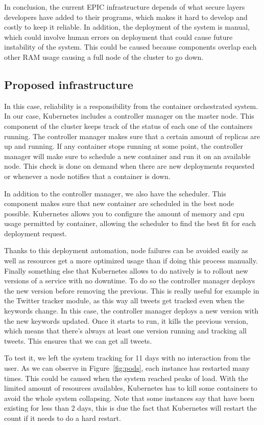 In conclusion, the current EPIC infrastructure depends of what secure layers developers have added to their programs, which makes it hard to develop and costly to keep it reliable. In addition, the deployment of the system is manual, which could involve human errors on deployment that could cause future instability of the system. This could be caused because components overlap each other RAM usage causing a full node of the cluster to go down.

\subsection{Proposed infrastructure}

In this case, reliability is a responsibility from the container orchestrated system. In our case, Kubernetes includes a controller manager on the master node. This component of the cluster keeps track of the status of each one of the containers running. The controller manager makes sure that a certain amount of replicas are up and running. If any container stops running at some point, the controller manager will make sure to schedule a new container and run it on an available node. This check is done on demand when there are new deployments requested or whenever a node notifies that a container is down.

 In addition to the controller manager, we also have the scheduler. This component makes sure that new container are scheduled in the best node possible. Kubernetes allows you to configure the amount of memory and cpu usage permitted by container, allowing the scheduler to find the best fit for each deployment request. 

Thanks to this deployment automation, node failures can be avoided easily as well as resources get a more optimized usage than if doing this process manually. Finally something else that Kubernetes allows to do natively is to rollout new versions of a service with no downtime. To do so the controller manager deploys the new version before removing the previous.  This is really useful for example in the Twitter tracker module, as this way all tweets get tracked even when the keywords change. In this case, the controller manager deploys a new version with the new keywords updated. Once it starts to run, it kills the previous version, which means that there’s always at least one version running and tracking all tweets. This ensures that we can get all tweets.

To test it, we left the system tracking for 11 days with no interaction from the user. As we can observe in Figure~\ref{fig:pods}, each instance has restarted many times. This could be caused when the  system reached peaks of load. With the limited amount of resources availables, Kubernetes has to kill some containers to avoid the whole system collapsing. Note that some instances say that have been existing for less than 2 days, this is due the fact that Kubernetes will restart the count if it needs to do a hard restart.



